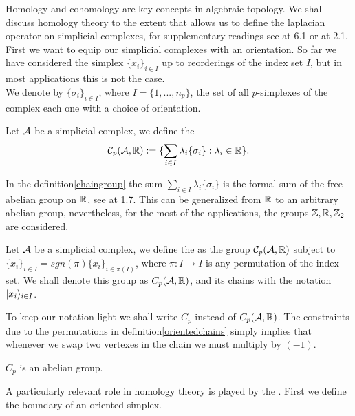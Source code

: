 \documentclass[../1.tex]{subfiles}
\begin{document}
    Homology and cohomology are key concepts in algebraic topology. We shall discuss homology theory to the extent
    that allows us to define the laplacian operator on simplicial complexes, for supplementary readings see \cite{singerthorpe} at 6.1 or \cite{hatcher} at 2.1.
    First we want to equip our simplicial complexes with an orientation. So far we have considered the simplex $\{x_i\}_{i \in I}$ up to reorderings of the index set $I$, but in most applications this is not the case.\\
   
    We denote by $\{\sigma_i\}_{i \in I}$, where $I = \{1,...,n_p\}$, the set of all $p$-simplexes of the complex each one with a choice
    of orientation.

    \begin{defn}
        \label{chaingroup}
        Let $\mathcal{A}$ be a simplicial complex, we define the  
        \[ \mathcal{C}_p(\mathcal{A},\mathbb{R}) := \{ \sum_{i \in I} \lambda_i \{\sigma_i\} : \lambda_i \in \mathbb{R} \}.\]
    \end{defn}

    In the definition\autoref{chaingroup} the sum $\sum_{i \in I} \lambda_i \{\sigma_i\}$ is the formal sum of the free abelian group on $\mathbb{R}$, see \cite{lang} at 1.7.
    This can be generalized from $\mathbb{R}$ to an arbitrary abelian group, nevertheless, for the most of the applications, the groups $\mathbb{Z},\mathbb{R},\mathbb{Z}_2$ are considered. 

    \begin{defn}
        \label{orientedchains}
        Let $\mathcal{A}$ be a simplicial complex, we define the  as
        the group $\mathcal{C}_p(\mathcal{A},\mathbb{R})$ subject to $ \{x_i\}_{i \in I} = sgn(\pi)\{x_i\}_{i \in \pi(I)}$, where $\pi:I \to I$ is 
        any permutation of the index set. We shall denote this group as $C_p(\mathcal{A},\mathbb{R})$, and its chains with the notation $| x_i \rangle_{i \in I}$.
    \end{defn}

    To keep our notation light we shall write $C_p$ instead of $C_p(\mathcal{A},\mathbb{R})$. The constraints due to the 
    permutations in definition\autoref{orientedchains} simply implies that whenever we swap two vertexes in the chain
    we must multiply by $(-1)$.
    
    \begin{prop}
        $C_p$ is an abelian group.
    \end{prop}

    A particularly relevant role in homology theory is played by the . First we define the boundary of an oriented simplex.
\end{document}
